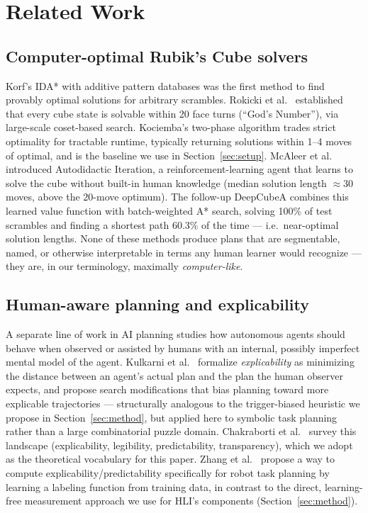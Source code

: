 \documentclass[10pt,conference]{article}
\begin{document}
\section{Related Work}
\label{sec:related}

\subsection{Computer-optimal Rubik's Cube solvers}
\label{sec:related-optimal}
Korf's IDA* with additive pattern databases \citep{korf1997} was the
first method to find provably optimal solutions for arbitrary
scrambles. Rokicki et al.\ \citep{rokicki2014} established that every
cube state is solvable within 20 face turns (``God's Number''), via
large-scale coset-based search. Kociemba's two-phase algorithm
\citep{kociemba} trades strict optimality for tractable runtime,
typically returning solutions within 1--4 moves of optimal, and is
the baseline we use in Section~\ref{sec:setup}. McAleer et al.\ \citep{mcaleer2018} introduced Autodidactic
Iteration, a reinforcement-learning agent that learns to solve the
cube without built-in human knowledge (median solution length
$\approx$30 moves, above the 20-move optimum). The follow-up
DeepCubeA \citep{agostinelli2019} combines this learned value
function with batch-weighted A* search, solving 100\% of test
scrambles and finding a shortest path 60.3\% of the time --- i.e.\
near-optimal solution lengths. None of these
methods produce plans that are segmentable, named, or otherwise
interpretable in terms any human learner would recognize --- they are,
in our terminology, maximally \emph{computer-like}.

\subsection{Human-aware planning and explicability}
\label{sec:related-explicability}
A separate line of work in AI planning studies how autonomous agents
should behave when observed or assisted by humans with an internal,
possibly imperfect mental model of the agent. Kulkarni et
al.\ \citep{kulkarni2016} formalize \emph{explicability} as
minimizing the distance between an agent's actual plan and the plan
the human observer expects, and propose search modifications that
bias planning toward more explicable trajectories --- structurally
analogous to the trigger-biased heuristic we propose in
Section~\ref{sec:method}, but applied here to symbolic task planning
rather than a large combinatorial puzzle domain. Chakraborti et
al.\ \citep{chakraborti2019} survey this landscape (explicability,
legibility, predictability, transparency), which we adopt as the
theoretical vocabulary for this paper. Zhang et al.\ \citep{zhang2017}
propose a way to compute explicability/predictability specifically
for robot task planning by learning a labeling function from
training data, in contrast to the direct, learning-free measurement
approach we use for HLI's components (Section~\ref{sec:method}).
\end{document}
